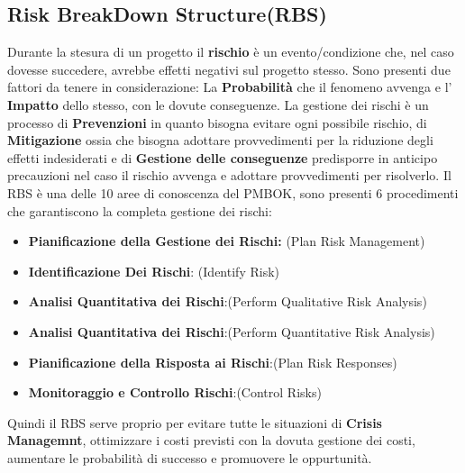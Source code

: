 \documentclass{article}
\begin{document}
\subsection{Risk BreakDown Structure(RBS)}
Durante la stesura di un progetto il \textbf{rischio} è un evento/condizione che, nel caso dovesse succedere, avrebbe effetti negativi sul progetto stesso.
Sono presenti due fattori da tenere in considerazione: La \textbf{Probabilità} che il fenomeno avvenga e l' \textbf{Impatto} dello stesso, con le dovute conseguenze.
La gestione dei rischi è un processo di \textbf{Prevenzioni} in quanto bisogna evitare ogni possibile rischio, di \textbf{Mitigazione} ossia che bisogna adottare provvedimenti per la riduzione degli effetti indesiderati e di \textbf{Gestione delle conseguenze} predisporre in anticipo precauzioni nel caso il rischio avvenga e adottare provvedimenti per risolverlo.
Il RBS è una delle 10 aree di conoscenza del PMBOK, sono presenti 6 procedimenti che garantiscono la completa gestione dei rischi:
\begin{itemize}

 \item \textbf{Pianificazione della Gestione dei Rischi:} (Plan Risk Management)
 
 \item \textbf{Identificazione Dei Rischi}: (Identify Risk)
 
 \item \textbf{Analisi Quantitativa dei Rischi}:(Perform Qualitative Risk Analysis)
 
 \item \textbf{Analisi Quantitativa dei Rischi}:(Perform Quantitative Risk Analysis)
 
 \item \textbf{Pianificazione della Risposta ai Rischi}:(Plan Risk Responses)
 
 \item \textbf{Monitoraggio e Controllo Rischi}:(Control Risks)
\end{itemize}

Quindi il RBS serve proprio per evitare tutte le situazioni di \textbf{Crisis Managemnt}, ottimizzare i costi previsti con la dovuta gestione dei costi, aumentare le probabilità di successo e promuovere le oppurtunità.
\end{document}
